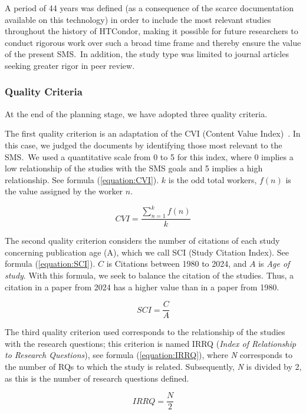 A period of 44 years was defined (as a consequence of the scarce documentation available on this technology) in order to include the most relevant studies throughout the history of HTCondor, making it possible for future researchers to conduct rigorous work over such a broad time frame and thereby ensure the value of the present SMS.~In addition, the study type was limited to journal articles seeking greater rigor in peer review.



\subsubsection{Quality Criteria}
At the end of the planning stage, we have adopted three quality criteria.

The first quality criterion is an adaptation of the CVI (Content Value Index)~\cite{Almanasreh2019214, yaghmaei2003content}. In this case, we judged the documents by identifying those most relevant to the SMS.~We used a quantitative scale from 0 to 5 for this index, where 0 implies a low relationship of the studies with the SMS goals and 5 implies a high relationship. See formula (\ref{equation:CVI}). $k$ is the odd total workers, $f(n)$ is the value assigned by the worker $n$.

\begin{equation}
	\label{equation:CVI}
	CVI = \frac{\sum_{n=1}^{k} f(n)}{k}
\end{equation}

The second quality criterion considers the number of citations of each study concerning publication age  (A), which we call SCI (Study Citation Index). See  formula (\ref{equation:SCI}). $C$ is Citations between 1980 to 2024, and $A$ is \textit{Age of study}. With this formula, we seek to balance the citation of the studies. Thus, a citation in a  paper from 2024 has a higher value than in a paper from 1980.


\begin{equation}
	\label{equation:SCI}
	SCI = \frac{C}{A}
\end{equation}


\hbox{}
The third quality criterion used corresponds to the relationship of the studies with the research questions; this criterion is named IRRQ (\textit{Index of Relationship to Research Questions}), see formula (\ref{equation:IRRQ}), where \textit{N} corresponds to the number of RQs to which the study is related. Subsequently, \textit{N} is divided by 2, as this is the number of research questions defined.

\begin{equation}
	\label{equation:IRRQ}
	IRRQ = \frac{N}{2}
\end{equation}

